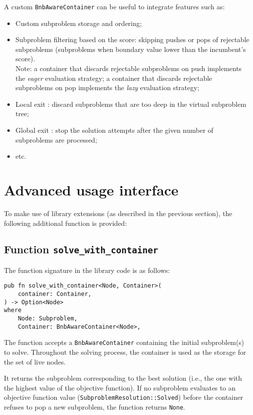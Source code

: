 A custom \texttt{BnbAwareContainer} can be useful to integrate features such as:

\begin{itemize}
 \item Custom subproblem storage and ordering;
 \item Subproblem filtering based on the score: skipping pushes or pops of rejectable
    subproblems (subproblems when boundary value lower than the incumbent's score). \\
    Note: a container that discards rejectable subproblems on push implements the \emph{eager}
    evaluation strategy; a container that discards rejectable subproblems on pop implements
    the \emph{lazy} evaluation strategy;
 \item Local exit \cite{narkawicz2013formalnasa}: discard subproblems that are too deep in
    the virtual subproblem tree;
 \item Global exit \cite{narkawicz2013formalnasa}: stop the solution attempts after the given
    number of subproblems are processed;
 \item etc.
\end{itemize}

\section{Advanced usage interface}

\label{sec:advanced_usage}

To make use of library extensions (as described in the previous section), the following
additional function is provided:

\subsection{Function \texttt{solve\_with\_container}}

The function signature in the library code is as follows:

\begin{lstlisting}[caption=Function \texttt{solve\_with\_container}]
pub fn solve_with_container<Node, Container>(
    container: Container,
) -> Option<Node>
where
    Node: Subproblem,
    Container: BnbAwareContainer<Node>,
\end{lstlisting}

The function accepts a \texttt{BnbAwareContainer} containing the initial subproblem(s) to
solve. Throughout the solving process, the container is used as the storage for the set of
live nodes.

It returns the subproblem corresponding to the best solution (i.e., the one with the
highest value of the objective function). If no subproblem evaluates to an objective
function value (\texttt{SubproblemResolution::Solved}) before the container refuses to pop
a new subproblem, the function returns \texttt{None}.
